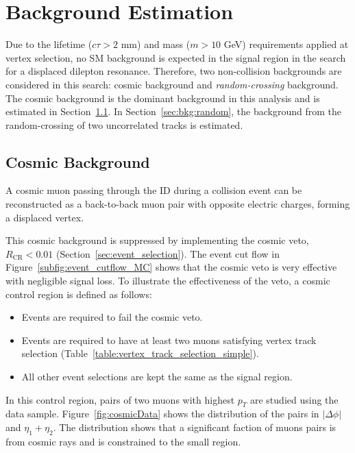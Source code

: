 \chapter{Background Estimation}
\label{chap:bkg}

Due to the lifetime ($c\tau > 2$ mm) and mass ($m > 10$ GeV) requirements applied at vertex selection, no SM background is expected in the signal region in the search for a displaced dilepton resonance. Therefore, two non-collision backgrounds are considered in this search: cosmic background and \textit{random-crossing} background. The cosmic background is the dominant background in this analysis and is estimated in Section~\ref{sec:bkg:cosmic}. In Section~\ref{sec:bkg:random}, the background from the random-crossing of two uncorrelated tracks is estimated.


\section{Cosmic Background}
\label{sec:bkg:cosmic}

A cosmic muon passing through the ID during a collision event can be reconstructed as a back-to-back muon pair with opposite electric charges, forming a displaced \mumu vertex.

This cosmic background is suppressed by implementing the cosmic veto, $R_{\mathrm{CR}} < 0.01$ (Section~\ref{sec:event_selection}). The event cut flow in Figure~\ref{subfig:event_cutflow_MC} shows that the cosmic veto is very effective with negligible signal loss. To illustrate the effectiveness of the veto, a cosmic control region is defined as follows:

\begin{itemize}
  \item Events are required to fail the cosmic veto.
  \item Events are required to have at least two muons satisfying vertex track selection (Table~\ref{table:vertex_track_selection_simple}).
  \item All other event selections are kept the same as the signal region.
\end{itemize}

In this control region, pairs of two muons with highest $p_{T}$ are studied using the data sample. Figure~\ref{fig:cosmicData} shows the distribution of the pairs in $|\Delta\phi|$ and $\eta_{1}+\eta_{2}$. The distribution shows that a significant faction of muons pairs is from cosmic rays and is constrained to the small \Rcr region.

